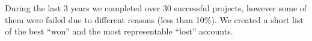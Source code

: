 During the last 3 years we completed over 30 successful projects,
however some of them were failed due to different reasons (less than 10\%).
We created a short list of the best ``won'' and the most representable ``lost'' 
accounts.
